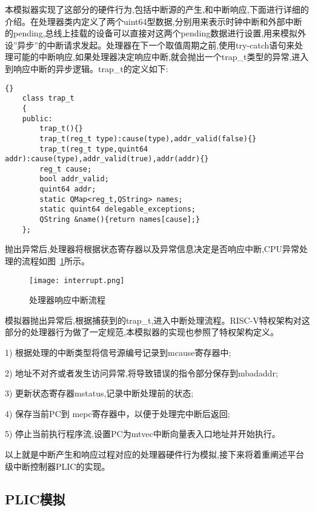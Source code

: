 本模拟器实现了这部分的硬件行为,包括中断源的产生,和中断响应,下面进行详细的介绍。在处理器类内定义了两个uint64型数据,分别用来表示时钟中断和外部中断的pending,总线上挂载的设备可以直接对这两个pending数据进行设置,用来模拟外设”异步”的中断请求发起。处理器在下一个取值周期之前,使用try-catch语句来处理可能的中断响应,如果处理器决定响应中断,就会抛出一个trap\_t类型的异常,进入到响应中断的异步逻辑。trap\_t的定义如下:
\clearpage
\begin{lstlisting}{}
    class trap_t
    {
    public:
        trap_t(){}
        trap_t(reg_t type):cause(type),addr_valid(false){}
        trap_t(reg_t type,quint64 addr):cause(type),addr_valid(true),addr(addr){}
        reg_t cause;
        bool addr_valid;
        quint64 addr;
        static QMap<reg_t,QString> names;
        static quint64 delegable_exceptions;
        QString &name(){return names[cause];}
    };        
\end{lstlisting}

抛出异常后,处理器将根据状态寄存器以及异常信息决定是否响应中断,CPU异常处理的流程如图~\ref{fig:interrupt}所示。
\begin{figure}[H]
    \centering
    \texttt{[image: interrupt.png]}
    \caption{处理器响应中断流程}
    \label{fig:interrupt}
\end{figure}

模拟器抛出异常后,根据捕获到的trap\_t,进入中断处理流程。RISC-V特权架构对这部分的处理器行为做了一定规范,本模拟器的实现也参照了特权架构定义。


1) 根据处理的中断类型将信号源编号记录到mcause寄存器中;


2) 地址不对齐或者发生访问异常,将导致错误的指令部分保存到mbadaddr;


3) 更新状态寄存器mstatus,记录中断处理前的状态;


4) 保存当前PC到 mepc寄存器中，以便于处理完中断后返回;


5) 停止当前执行程序流,设置PC为mtvec中断向量表入口地址并开始执行。


以上就是中断产生和响应过程对应的处理器硬件行为模拟,接下来将着重阐述平台级中断控制器PLIC的实现。


\subsection{PLIC模拟}

